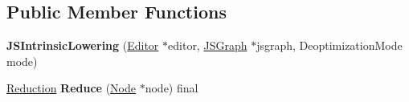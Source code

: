 \subsection*{Public Member Functions}
\begin{DoxyCompactItemize}
\item 
{\bfseries J\+S\+Intrinsic\+Lowering} (\hyperlink{classv8_1_1internal_1_1compiler_1_1_advanced_reducer_1_1_editor}{Editor} $\ast$editor, \hyperlink{classv8_1_1internal_1_1compiler_1_1_j_s_graph}{J\+S\+Graph} $\ast$jsgraph, Deoptimization\+Mode mode)\hypertarget{classv8_1_1internal_1_1compiler_1_1_j_s_intrinsic_lowering_adb2c73091e40102177802aa22b26ace1}{}\label{classv8_1_1internal_1_1compiler_1_1_j_s_intrinsic_lowering_adb2c73091e40102177802aa22b26ace1}

\item 
\hyperlink{classv8_1_1internal_1_1compiler_1_1_reduction}{Reduction} {\bfseries Reduce} (\hyperlink{classv8_1_1internal_1_1compiler_1_1_node}{Node} $\ast$node) final\hypertarget{classv8_1_1internal_1_1compiler_1_1_j_s_intrinsic_lowering_a5efff03e40c4dc32ae92ee22b553305f}{}\label{classv8_1_1internal_1_1compiler_1_1_j_s_intrinsic_lowering_a5efff03e40c4dc32ae92ee22b553305f}

\end{DoxyCompactItemize}
